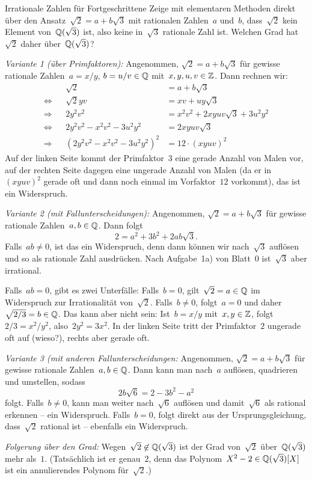 \documentclass{algblatt}
\begin{document}
\begin{aufgabe}{Irrationale Zahlen für Fortgeschrittene}
Zeige mit elementaren Methoden direkt über den Ansatz~$\sqrt{2} = a +
b\sqrt{3}$ mit rationalen Zahlen~$a$ und~$b$, dass~$\sqrt{2}$ kein Element
von~$\mathbb{Q}(\sqrt{3})$ ist, also keine in~$\sqrt{3}$ rationale Zahl ist. Welchen
Grad hat~$\sqrt{2}$ daher über~$\mathbb{Q}(\sqrt{3})$?

\begin{loesung}
\emph{Variante 1 (über Primfaktoren):} Angenommen, $\sqrt{2} = a + b \sqrt{3}$
für gewisse rationale Zahlen~$a = x/y$, $b = u/v \in \mathbb{Q}$ mit~$x,y,u,v \in
\mathbb{Z}$. Dann rechnen wir:
\begin{align*}
  && \sqrt{2} &= a + b \sqrt{3} \\
  \Longleftrightarrow && \sqrt{2} y v &= xv + uy \sqrt{3} \\
  \Longrightarrow && 2 y^2 v^2 &= x^2 v^2 + 2 xyuv \sqrt{3} + 3 u^2 y^2 \\
  \Longleftrightarrow && 2 y^2 v^2 - x^2 v^2 - 3 u^2 y^2 &= 2 xyuv \sqrt{3} \\
  \Longrightarrow && (2 y^2 v^2 - x^2 v^2 - 3 u^2 y^2)^2 &= 12 \cdot (xyuv)^2
\end{align*}
Auf der linken Seite kommt der Primfaktor~$3$ eine gerade Anzahl von Malen vor,
auf der rechten Seite dagegen eine ungerade Anzahl von Malen (da er
in~$(xyuv)^2$ gerade oft und dann noch einmal im Vorfaktor~$12$ vorkommt), das
ist ein Widerspruch.

\emph{Variante 2 (mit Fallunterscheidungen):} Angenommen, $\sqrt{2} = a + b
\sqrt{3}$ für gewisse rationale Zahlen~$a, b \in \mathbb{Q}$. Dann folgt
\[ 2 = a^2 + 3b^2 + 2ab \sqrt{3}. \]
Falls~$ab \neq 0$, ist das ein Widerspruch, denn dann können wir
nach~$\sqrt{3}$ auflösen und so als rationale Zahl ausdrücken. Nach Aufgabe~1a)
von Blatt~0 ist~$\sqrt{3}$ aber irrational.

Falls~$ab = 0$, gibt es zwei Unterfälle: Falls~$b = 0$, gilt~$\sqrt{2} = a \in
\mathbb{Q}$ im Widerspruch zur Irrationalität von~$\sqrt{2}$. Falls~$b \neq 0$,
folgt~$a = 0$ und daher~$\sqrt{2/3} = b \in \mathbb{Q}$. Das kann aber nicht sein:
Ist~$b = x/y$ mit~$x,y \in \mathbb{Z}$, folgt~$2/3 = x^2/y^2$, also~$2y^2 = 3x^2$. In
der linken Seite tritt der Primfaktor~$2$ ungerade oft auf (wieso?), rechts
aber gerade oft.

\emph{Variante 3 (mit anderen Fallunterscheidungen:} Angenommen, $\sqrt{2} = a
+ b \sqrt{3}$ für gewisse rationale Zahlen~$a, b \in \mathbb{Q}$. Dann kann man
nach~$a$ auflösen, quadrieren und umstellen, sodass
\[ 2 b \sqrt{6} = 2 - 3 b^2 - a^2 \]
folgt. Falls~$b \neq 0$, kann man weiter nach~$\sqrt{6}$ auflösen und
damit~$\sqrt{6}$ als rational erkennen -- ein Widerspruch. Falls~$b = 0$, folgt
direkt aus der Ursprungsgleichung, dass~$\sqrt{2}$ rational ist -- ebenfalls
ein Widerspruch.

\emph{Folgerung über den Grad:} Wegen~$\sqrt{2} \not\in \mathbb{Q}(\sqrt{3})$ ist der
Grad von~$\sqrt{2}$ über~$\mathbb{Q}(\sqrt{3})$ mehr als~$1$. (Tatsächlich ist er
genau~$2$, denn das Polynom~$X^2 - 2 \in \mathbb{Q}(\sqrt{3})[X]$ ist ein
annulierendes Polynom für~$\sqrt{2}$.)
\end{loesung}
\end{aufgabe}
\end{document}

